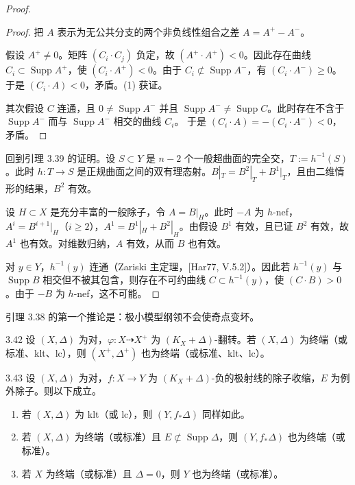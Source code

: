 \begin{proof}
\begin{proof}
把 $A$ 表示为无公共分支的两个非负线性组合之差 $A=A^{+}-A^{-}$。

假设 $A^{+}\ne0$。矩阵 $(C_i\cdot C_j)$ 负定，故 $(A^{+}\cdot A^{+})<0$。因此存在曲线 $C_i\subset\operatorname{Supp}A^{+}$，使 $(C_i\cdot A^{+})<0$。由于 $C_i\not\subset\operatorname{Supp}A^{-}$，有 $(C_i\cdot A^{-})\ge0$。于是 $(C_i\cdot A)<0$，矛盾。(1) 获证。

其次假设 $C$ 连通，且 $0\ne\operatorname{Supp}A^{-}$ 并且 $\operatorname{Supp}A^{-}\ne\operatorname{Supp}C$。此时存在不含于 $\operatorname{Supp}A^{-}$ 而与 $\operatorname{Supp}A^{-}$ 相交的曲线 $C_i$。
于是 $(C_i\cdot A)=-(C_i\cdot A^{-})<0$，矛盾。
\end{proof}

回到引理 3.39 的证明。设 $S\subset Y$ 是 $n-2$ 个一般超曲面的完全交，$T:=h^{-1}(S)$。此时 $h:T\to S$ 是正规曲面之间的双有理态射。$B|_T=B^2|_T+B^1|_T$，且由二维情形的结果，$B^2$ 有效。

设 $H\subset X$ 是充分丰富的一般除子，令 $A=B|_H$。此时 $-A$ 为 $h$-nef，$A^i=B^{i+1}|_H$（$i\ge2$），$A^1=B^1|_H+B^2|_H$。由假设 $B^1$ 有效，且已证 $B^2$ 有效，故 $A^1$ 也有效。对维数归纳，$A$ 有效，从而 $B$ 也有效。

对 $y\in Y$，$h^{-1}(y)$ 连通（Zariski 主定理，[Har77, V.5.2]）。因此若 $h^{-1}(y)$ 与 $\operatorname{Supp}B$ 相交但不被其包含，则存在不可约曲线 $C\subset h^{-1}(y)$，使 $(C\cdot B)>0$。由于 $-B$ 为 $h$-nef，这不可能。
\end{proof}

引理 3.38 的第一个推论是：极小模型纲领不会使奇点变坏。

\begin{corollary*}{3.42}
设 $(X,\Delta)$ 为对，$\varphi:X\dashrightarrow X^{+}$ 为 $(K_X+\Delta)$-翻转。若 $(X,\Delta)$ 为终端（或标准、klt、lc），则 $(X^{+},\Delta^{+})$ 也为终端（或标准、klt、lc）。
\end{corollary*}

\begin{corollaryp}{3.43}
设 $(X,\Delta)$ 为对，$f:X\to Y$ 为 $(K_X+\Delta)$-负的极射线的除子收缩，$E$ 为例外除子。则以下成立。
\begin{enumerate}[label=(\arabic*)]
\item 若 $(X,\Delta)$ 为 klt（或 lc），则 $(Y,f_*\Delta)$ 同样如此。
\item 若 $(X,\Delta)$ 为终端（或标准）且 $E\not\subset\operatorname{Supp}\Delta$，则 $(Y,f_*\Delta)$ 也为终端（或标准）。
\item 若 $X$ 为终端（或标准）且 $\Delta=0$，则 $Y$ 也为终端（或标准）。
\end{enumerate}
\end{corollaryp}

